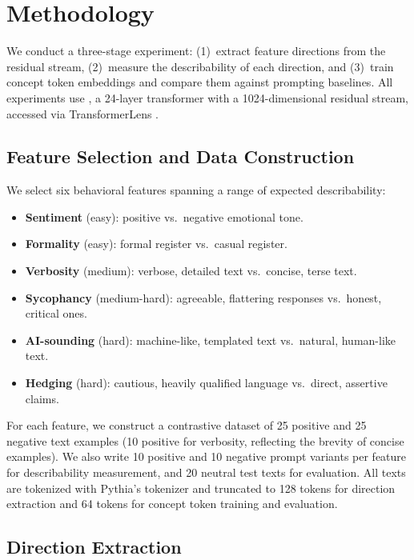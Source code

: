 \section{Methodology}
\label{sec:method}

We conduct a three-stage experiment: (1)~extract feature directions from the residual stream, (2)~measure the describability of each direction, and (3)~train concept token embeddings and compare them against prompting baselines. All experiments use \pythia \cite{biderman2023pythia}, a 24-layer transformer with a 1024-dimensional residual stream, accessed via TransformerLens \cite{nanda2022transformerlens}.

\subsection{Feature Selection and Data Construction}
\label{sec:features}

We select six behavioral features spanning a range of expected describability:

\begin{itemize}[leftmargin=*,itemsep=1pt,topsep=2pt]
    \item \textbf{Sentiment} (easy): positive vs.\ negative emotional tone.
    \item \textbf{Formality} (easy): formal register vs.\ casual register.
    \item \textbf{Verbosity} (medium): verbose, detailed text vs.\ concise, terse text.
    \item \textbf{Sycophancy} (medium-hard): agreeable, flattering responses vs.\ honest, critical ones.
    \item \textbf{AI-sounding} (hard): machine-like, templated text vs.\ natural, human-like text.
    \item \textbf{Hedging} (hard): cautious, heavily qualified language vs.\ direct, assertive claims.
\end{itemize}

For each feature, we construct a contrastive dataset of 25 positive and 25 negative text examples (10 positive for verbosity, reflecting the brevity of concise examples). We also write 10 positive and 10 negative prompt variants per feature for describability measurement, and 20 neutral test texts for evaluation. All texts are tokenized with Pythia's tokenizer and truncated to 128 tokens for direction extraction and 64 tokens for concept token training and evaluation.

\subsection{Direction Extraction}
\label{sec:directions}

